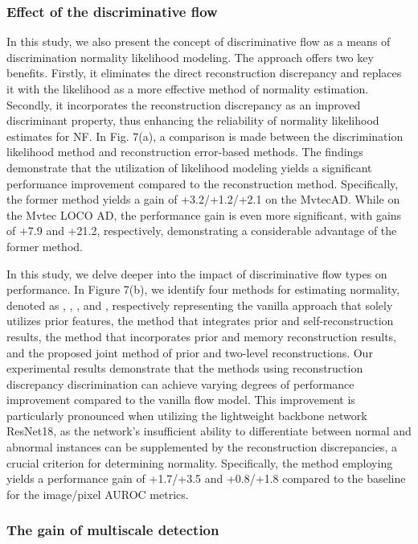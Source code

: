 \documentclass[journal]{IEEEtran}
\begin{document}
 
\subsubsection{Effect of the discriminative flow}

In this study, we also present the concept of discriminative flow as a means of discrimination normality likelihood modeling. The approach offers two key benefits. Firstly, it eliminates the direct reconstruction discrepancy and replaces it with the likelihood as a more effective method of normality estimation. Secondly, it incorporates the reconstruction discrepancy as an improved discriminant property, thus enhancing the reliability of normality likelihood estimates for NF. In Fig. 7(a), a comparison is made between the discrimination likelihood method and reconstruction error-based methods. The findings demonstrate that the utilization of likelihood modeling yields a significant performance improvement compared to the reconstruction method. Specifically, the former method yields a gain of +3.2/+1.2/+2.1 on the MvtecAD. While on the Mvtec LOCO AD, the performance gain is even more significant, with gains of +7.9 and +21.2, respectively, demonstrating a considerable advantage of the former method.

In this study, we delve deeper into the impact of discriminative flow types on performance. In Figure 7(b), we identify four methods for estimating normality, denoted as , , , and , respectively representing the vanilla approach that solely utilizes prior features, the method that integrates prior and self-reconstruction results, the method that incorporates prior and memory reconstruction results, and the proposed joint method of prior and two-level reconstructions. Our experimental results demonstrate that the methods using reconstruction discrepancy discrimination can achieve varying degrees of performance improvement compared to the vanilla  flow model. This improvement is particularly pronounced when utilizing the lightweight backbone network ResNet18, as the network's insufficient ability to differentiate between normal and abnormal instances can be supplemented by the reconstruction discrepancies, a crucial criterion for determining normality. Specifically, the method employing  yields a performance gain of +1.7/+3.5 and +0.8/+1.8 compared to the baseline  for the image/pixel AUROC metrics.



\subsubsection{The gain of multiscale detection}
\end{document}
